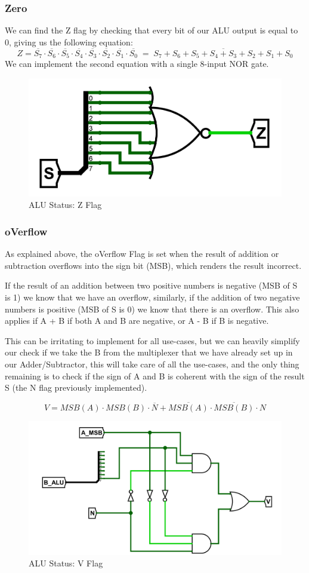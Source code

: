 \documentclass{article}
\begin{document}
\subsubsection{Zero}
We can find the Z flag by checking that every bit of our ALU output is equal to 0, giving us the following equation:
$$
Z = \overline{S_7} \cdot \overline{S_6} \cdot \overline{S_5} \cdot \overline{S_4} \cdot \overline{S_3} \cdot \overline{S_2} \cdot \overline{S_1} \cdot \overline{S_0} \; = \; \overline{S_7 + S_6 + S_5 + S_4 + S_3 + S_2 + S_1 + S_0}
$$
We can implement the second equation with a single 8-input NOR gate.

\begin{figure}[H]
    \centering
    \includegraphics[width=.5\textwidth]{circuits/status_z.png}
    \caption{ALU Status: Z Flag}
\end{figure}

\subsubsection{oVerflow}
As explained above, the oVerflow Flag is set when the result of addition or subtraction overflows into the sign bit (MSB), which renders the result incorrect.

If the result of an addition between two positive numbers is negative (MSB of S is 1) we know that we have an overflow, similarly, if the addition of two negative numbers is positive (MSB of S is 0) we know that there is an overflow.
This also applies if A + B if both A and B are negative, or A - B if B is negative.

This can be irritating to implement for all use-cases, but we can heavily simplify our check if we take the B from the multiplexer that we have already set up in our Adder/Subtractor, this will take care of all the use-cases, and the only thing remaining is to check if the sign of A and B is coherent with the sign of the result S (the N flag previously implemented).

$$
V = MSB(A) \cdot MSB(B) \cdot \overline{N} + \overline{MSB(A)} \cdot \overline{MSB(B)} \cdot N
$$

\begin{figure}[H]
    \centering
    \includegraphics[width=.8\textwidth]{circuits/status_v.png}
    \caption{ALU Status: V Flag}
\end{figure}
\end{document}
